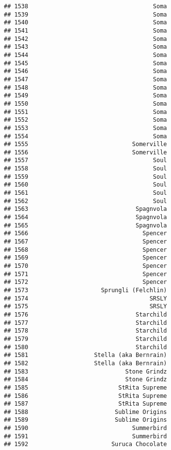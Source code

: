 \documentclass[
]{article}
\begin{document}
\begin{verbatim}
## 1538                                    Soma
## 1539                                    Soma
## 1540                                    Soma
## 1541                                    Soma
## 1542                                    Soma
## 1543                                    Soma
## 1544                                    Soma
## 1545                                    Soma
## 1546                                    Soma
## 1547                                    Soma
## 1548                                    Soma
## 1549                                    Soma
## 1550                                    Soma
## 1551                                    Soma
## 1552                                    Soma
## 1553                                    Soma
## 1554                                    Soma
## 1555                              Somerville
## 1556                              Somerville
## 1557                                    Soul
## 1558                                    Soul
## 1559                                    Soul
## 1560                                    Soul
## 1561                                    Soul
## 1562                                    Soul
## 1563                               Spagnvola
## 1564                               Spagnvola
## 1565                               Spagnvola
## 1566                                 Spencer
## 1567                                 Spencer
## 1568                                 Spencer
## 1569                                 Spencer
## 1570                                 Spencer
## 1571                                 Spencer
## 1572                                 Spencer
## 1573                     Sprungli (Felchlin)
## 1574                                   SRSLY
## 1575                                   SRSLY
## 1576                               Starchild
## 1577                               Starchild
## 1578                               Starchild
## 1579                               Starchild
## 1580                               Starchild
## 1581                   Stella (aka Bernrain)
## 1582                   Stella (aka Bernrain)
## 1583                            Stone Grindz
## 1584                            Stone Grindz
## 1585                          StRita Supreme
## 1586                          StRita Supreme
## 1587                          StRita Supreme
## 1588                         Sublime Origins
## 1589                         Sublime Origins
## 1590                              Summerbird
## 1591                              Summerbird
## 1592                        Suruca Chocolate

\end{verbatim}
\end{document}
